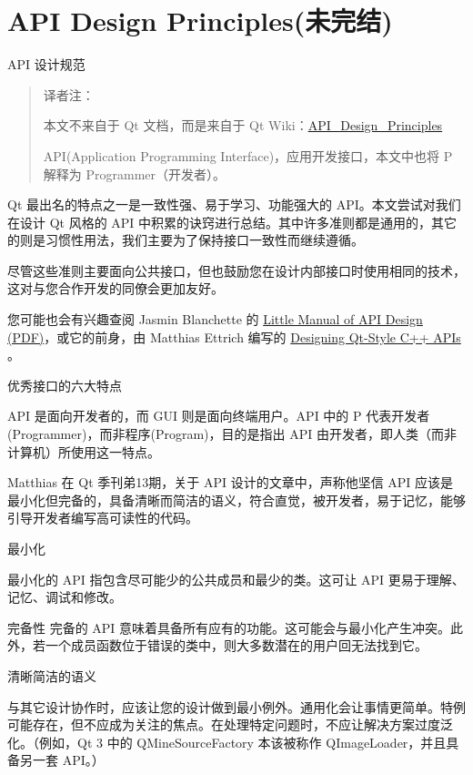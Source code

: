 \chapter{API Design Principles(未完结)}

API 设计规范

\begin{quote}
译者注：

本文不来自于 Qt 文档，而是来自于 Qt Wiki：\href{https://wiki.qt.io/API_Design_Principles}{API\_Design\_Principles}

API(Application Programming Interface)，应用开发接口，本文中也将 P 解释为 Programmer（开发者）。	
\end{quote}

Qt 最出名的特点之一是一致性强、易于学习、功能强大的 API。本文尝试对我们在设计 Qt 风格的 API 中积累的诀窍进行总结。其中许多准则都是通用的，其它的则是习惯性用法，我们主要为了保持接口一致性而继续遵循。

尽管这些准则主要面向公共接口，但也鼓励您在设计内部接口时使用相同的技术，这对与您合作开发的同僚会更加友好。

您可能也会有兴趣查阅 Jasmin Blanchette 的 
\href{https://people.mpi-inf.mpg.de/~jblanche/api-design.pdf}{Little Manual of API Design (PDF)}，或它的前身，由 Matthias Ettrich 编写的 \href{https://doc.qt.io/archives/qq/qq13-apis.html}{Designing Qt-Style C++ APIs} 。

优秀接口的六大特点

API 是面向开发者的，而 GUI 则是面向终端用户。API 中的 P 代表开发者(Programmer)，而非程序(Program)，目的是指出 API 由开发者，即人类（而非计算机）所使用这一特点。

Matthias 在 Qt 季刊弟13期，关于 API 设计的文章中，声称他坚信 API 应该是最小化但完备的，具备清晰而简洁的语义，符合直觉，被开发者，易于记忆，能够引导开发者编写高可读性的代码。

最小化

最小化的 API 指包含尽可能少的公共成员和最少的类。这可让 API 更易于理解、记忆、调试和修改。

完备性
完备的 API 意味着具备所有应有的功能。这可能会与最小化产生冲突。此外，若一个成员函数位于错误的类中，则大多数潜在的用户回无法找到它。

清晰简洁的语义

与其它设计协作时，应该让您的设计做到最小例外。通用化会让事情更简单。特例可能存在，但不应成为关注的焦点。在处理特定问题时，不应让解决方案过度泛化。（例如，Qt 3 中的 QMineSourceFactory 本该被称作 QImageLoader，并且具备另一套 API。）

